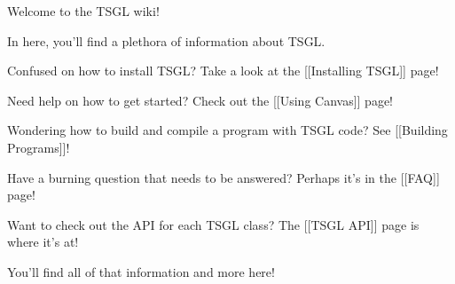 Welcome to the T\-S\-G\-L wiki!

In here, you'll find a plethora of information about T\-S\-G\-L.

Confused on how to install T\-S\-G\-L? Take a look at the \mbox{[}\mbox{[}Installing T\-S\-G\-L\mbox{]}\mbox{]} page!

Need help on how to get started? Check out the \mbox{[}\mbox{[}Using Canvas\mbox{]}\mbox{]} page!

Wondering how to build and compile a program with T\-S\-G\-L code? See \mbox{[}\mbox{[}Building Programs\mbox{]}\mbox{]}!

Have a burning question that needs to be answered? Perhaps it's in the \mbox{[}\mbox{[}F\-A\-Q\mbox{]}\mbox{]} page!

Want to check out the A\-P\-I for each T\-S\-G\-L class? The \mbox{[}\mbox{[}T\-S\-G\-L A\-P\-I\mbox{]}\mbox{]} page is where it’s at!

You'll find all of that information and more here! 